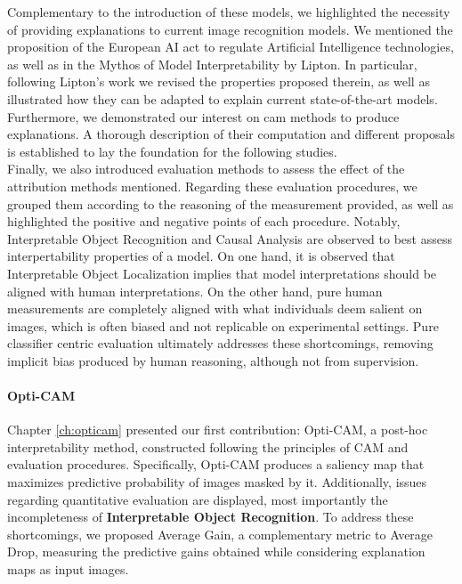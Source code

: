 \noindent Complementary to the introduction of these models, we highlighted the 
necessity of providing explanations to current image recognition models. We mentioned the proposition  
of the European AI act to regulate Artificial Intelligence technologies, as well as in the 
Mythos of Model Interpretability by Lipton. In particular, following Lipton's work we 
revised the properties proposed therein, as well as illustrated how they can be adapted to explain 
current state-of-the-art models. Furthermore, we demonstrated our interest on \gls{cam} methods 
to produce explanations. A thorough description of their computation and different proposals is 
established to lay the foundation for the following studies.\\

\noindent Finally, we also introduced evaluation methods to assess the effect of the attribution 
methods mentioned. Regarding these evaluation procedures, we grouped 
them according to the reasoning of the measurement provided, as well as highlighted the positive 
and negative points of each procedure. Notably, Interpretable Object Recognition and 
Causal Analysis are observed to best assess interpertability properties of a model. On one 
hand, it is observed that Interpretable Object Localization implies that model 
interpretations should be aligned with human interpretations. On the other hand, pure human 
measurements are completely aligned with what individuals deem salient on images, which is often 
biased and not replicable on experimental settings. Pure classifier centric evaluation 
ultimately addresses these shortcomings, removing implicit bias produced by human reasoning, 
although not from supervision.\\

\paragraph{Opti-CAM}
\label{sub:conc_opti}
\noindent Chapter \ref{ch:opticam} presented our first contribution: Opti-CAM, a post-hoc 
interpretability method, constructed following the principles of CAM and evaluation 
procedures. Specifically, Opti-CAM produces a saliency map that maximizes predictive probability 
of images masked by it. Additionally, issues regarding quantitative evaluation are displayed, 
most importantly the incompleteness of \textbf{Interpretable Object Recognition}. To address these 
shortcomings, we proposed Average Gain, a complementary metric to Average Drop, measuring 
the predictive gains obtained while considering explanation maps as input images.\\

